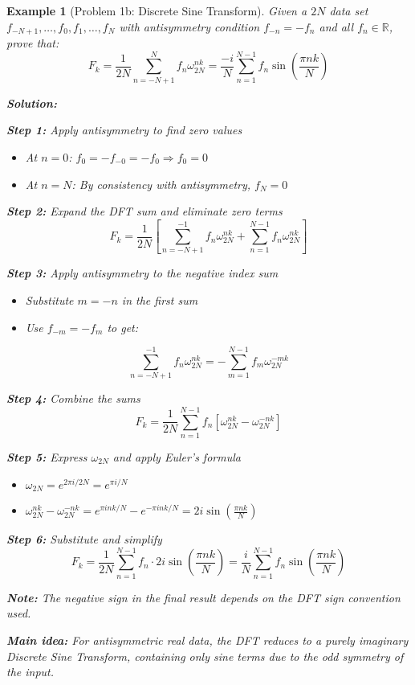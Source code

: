 \documentclass[11pt,a4paper]{article}
\newtheorem{example}[theorem]{Example}
\begin{document}
\begin{example}[Problem 1b: Discrete Sine Transform]
    Given a $2N$ data set $f_{-N+1}, \ldots, f_0, f_1, \ldots, f_N$ with antisymmetry condition $f_{-n} = -f_n$ and all $f_n \in \mathbb{R}$, prove that:
    $$F_k = \frac{1}{2N} \sum_{n=-N+1}^{N} f_n \omega_{2N}^{nk} = \frac{-i}{N} \sum_{n=1}^{N-1} f_n \sin\left(\frac{\pi nk}{N}\right)$$
    
    \textbf{Solution:}
    
    \textbf{Step 1:} Apply antisymmetry to find zero values
    \begin{itemize}
        \item At $n=0$: $f_0 = -f_{-0} = -f_0 \Rightarrow f_0 = 0$
        \item At $n=N$: By consistency with antisymmetry, $f_N = 0$
    \end{itemize}
    
    \textbf{Step 2:} Expand the DFT sum and eliminate zero terms
    $$F_k = \frac{1}{2N} \left[\sum_{n=-N+1}^{-1} f_n \omega_{2N}^{nk} + \sum_{n=1}^{N-1} f_n \omega_{2N}^{nk}\right]$$
    
    \textbf{Step 3:} Apply antisymmetry to the negative index sum
    \begin{itemize}
        \item Substitute $m = -n$ in the first sum
        \item Use $f_{-m} = -f_m$ to get:
    \end{itemize}
    $$\sum_{n=-N+1}^{-1} f_n \omega_{2N}^{nk} = -\sum_{m=1}^{N-1} f_m \omega_{2N}^{-mk}$$
    
    \textbf{Step 4:} Combine the sums
    $$F_k = \frac{1}{2N} \sum_{n=1}^{N-1} f_n \left[\omega_{2N}^{nk} - \omega_{2N}^{-nk}\right]$$
    
    \textbf{Step 5:} Express $\omega_{2N}$ and apply Euler's formula
    \begin{itemize}
        \item $\omega_{2N} = e^{2\pi i/2N} = e^{\pi i/N}$
        \item $\omega_{2N}^{nk} - \omega_{2N}^{-nk} = e^{\pi ink/N} - e^{-\pi ink/N} = 2i\sin\left(\frac{\pi nk}{N}\right)$
    \end{itemize}
    
    \textbf{Step 6:} Substitute and simplify
    $$F_k = \frac{1}{2N} \sum_{n=1}^{N-1} f_n \cdot 2i\sin\left(\frac{\pi nk}{N}\right) = \frac{i}{N} \sum_{n=1}^{N-1} f_n \sin\left(\frac{\pi nk}{N}\right)$$
    
    \textbf{Note:} The negative sign in the final result depends on the DFT sign convention used.
    
    \textbf{Main idea:} For antisymmetric real data, the DFT reduces to a purely imaginary Discrete Sine Transform, containing only sine terms due to the odd symmetry of the input.
\end{example}
\end{document}
